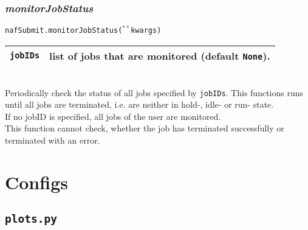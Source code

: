 \documentclass[12pt, a4paper]{article}
\newcommand{\kwargs}{$^{**}$kwargs}
\begin{document}
\subsubsection{\textit{monitorJobStatus}}
\texttt{nafSubmit.monitorJobStatus(\kwargs)}\\
\begin{tabular}{r|l}
\hline
\texttt{jobIDs}	&	list of jobs that are monitored (default \texttt{None}).\\
\hline
\end{tabular}
\\
Periodically check the status of all jobs specified by \texttt{jobIDs}. This functions runs until all jobs are terminated, i.e. are neither in hold-, idle- or run- state.\\
If no jobID is specified, all jobs of the user are monitored.\\
This function cannot check, whether the job has terminated successfully or terminated with an error.





\newpage
\section{Configs}

\subsection{\texttt{plots.py}}
\label{configs_plots}
\end{document}
